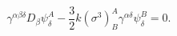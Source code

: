 \begin{equation} \label{graeq}
\gamma^{\alpha\beta\delta}D_\beta\psi^A_\delta-\frac{3}{2}k
(\sigma^3)^A_B \gamma^{\alpha\delta}\psi_\delta^B=0.
\end{equation}

